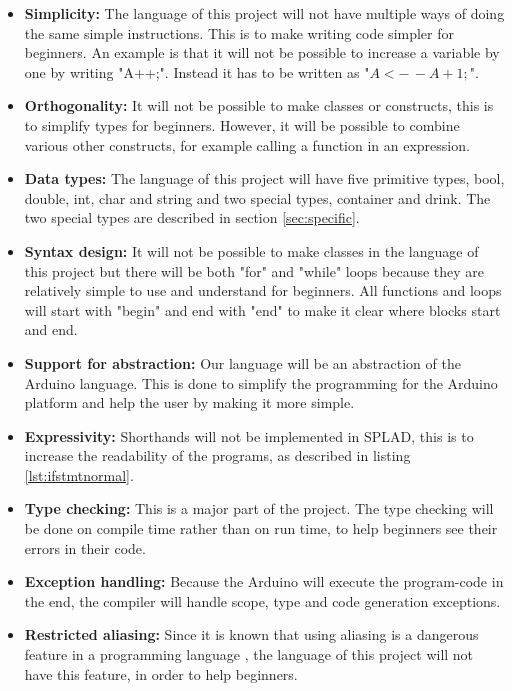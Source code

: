 \begin{itemize}

\item \textbf{Simplicity:} The language of this project will not have multiple ways of doing the same simple instructions. This is to make writing code simpler for beginners. An example is that it will not be possible to increase a variable by one by writing "A++;". Instead it has to be written as "$A<-\,-A+1;$".

\item \textbf{Orthogonality:} It will not be possible to make classes or constructs, this is to simplify types for beginners. However, it will be possible to combine various other constructs, for example calling a function in an expression. 

\item \textbf{Data types:} The language of this project will have five primitive types, bool, double, int, char and string and two special types, container and drink. The two special types are described in section \ref{sec:specific}.

\item \textbf{Syntax design:} It will not be possible to make classes in the language of this project but there will be both "for" and "while" loops because they are relatively simple to use and understand for beginners. All functions and loops will start with "begin" and end with "end" to make it clear where blocks start and end.

\item \textbf{Support for abstraction:} Our language will be an abstraction of the Arduino language. This is done to simplify the programming for the Arduino platform and help the user by making it more simple.

\item \textbf{Expressivity:} Shorthands will not be implemented in SPLAD, this is to increase the readability of the programs, as described in listing \ref{lst:ifstmtnormal}.

\item \textbf{Type checking:} This is a major part of the project. The type checking will be done on compile time rather than on run time, to help beginners see their errors in their code.

\item \textbf{Exception handling:} Because the Arduino will execute the program-code in the end, the compiler will handle scope, type and code generation exceptions.

\item \textbf{Restricted aliasing:} Since it is known that using aliasing is a dangerous feature in a programming language \citep{sebesta}, the language of this project will not have this feature, in order to help beginners.
\end{itemize}
